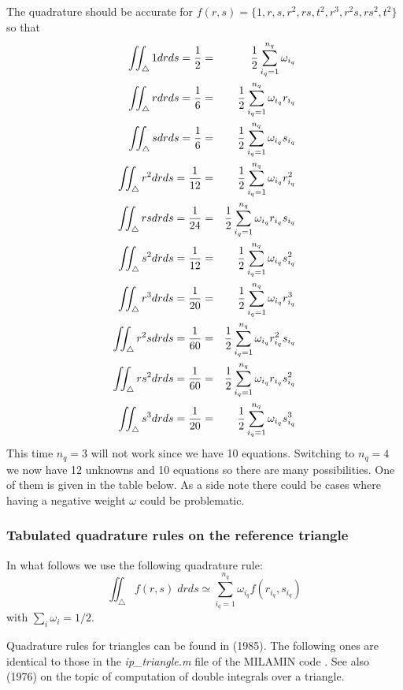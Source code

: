 The quadrature should be accurate for $f(r,s)=\{1,r,s,r^2,rs,t^2,r^3,r^2s,rs^2,t^2\}$ 
so that
\begin{eqnarray}
\iint_\triangle 1 drds = \frac12 &=& \frac12 \sum_{i_q=1}^{n_q}\omega_{i_q} \nonumber\\
\iint_\triangle r drds = \frac16 &=& \frac12 \sum_{i_q=1}^{n_q}\omega_{i_q} r_{i_q}\nonumber\\
\iint_\triangle s drds = \frac16 &=& \frac12 \sum_{i_q=1}^{n_q}\omega_{i_q} s_{i_q}\nonumber\\
\iint_\triangle r^2 drds = \frac1{12} &=& \frac12 \sum_{i_q=1}^{n_q}\omega_{i_q} r_{i_q}^2\nonumber\\
\iint_\triangle rsdrds = \frac1{24} &=& \frac12 \sum_{i_q=1}^{n_q}\omega_{i_q} r_{i_q}s_{i_q}\nonumber\\
\iint_\triangle s^2 drds = \frac1{12} &=& \frac12 \sum_{i_q=1}^{n_q}\omega_{i_q} s_{i_q}^2\nonumber\\
\iint_\triangle r^3 drds = \frac1{20} &=& \frac12 \sum_{i_q=1}^{n_q}\omega_{i_q} r_{i_q}^3\nonumber\\
\iint_\triangle r^2s drds = \frac1{60} &=& \frac12 \sum_{i_q=1}^{n_q}\omega_{i_q} r_{i_q}^2 s_{i_q}\nonumber\\
\iint_\triangle rs^2 drds = \frac1{60} &=& \frac12 \sum_{i_q=1}^{n_q}\omega_{i_q} r_{i_q} s_{i_q}^2\nonumber\\
\iint_\triangle s^3 drds = \frac1{20} &=& \frac12 \sum_{i_q=1}^{n_q}\omega_{i_q} s_{i_q}^3\nonumber\\
\end{eqnarray}
This time $n_q=3$ will not work since we have 10 equations. Switching to $n_q=4$
we now have 12 unknowns and 10 equations so there are many possibilities. 
One of them is given in the table below. As a side note there could be cases where 
having a negative weight $\omega$ could be problematic. 


\subsubsection*{Tabulated quadrature rules on the reference triangle}

In what follows we use the following quadrature rule:
\[
\iint_\triangle f(r,s) \; drds 
\simeq \sum_{i_q=1}^{n_q} \omega_{i_q} f(r_{i_q},s_{i_q})
\]
with $\sum_i\omega_i=1/2$.

Quadrature rules for triangles can be found in \textcite{duna85} (1985).
The following ones are identical to those in the {\sl ip\_triangle.m} 
file of the MILAMIN code \cite{daks08}. See also \textcite{leth76} (1976)
on the topic of computation of double integrals over a triangle.

